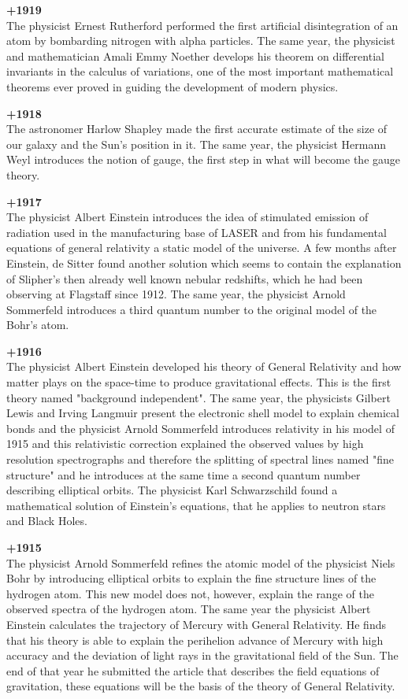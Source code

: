 \textbf{+1919}\\
The physicist Ernest Rutherford performed the first artificial disintegration of an atom by bombarding nitrogen with alpha particles. The same year, the physicist and mathematician Amali Emmy Noether develops his theorem on differential invariants in the calculus of variations, one of the most important mathematical theorems ever proved in guiding the development of modern physics.

\textbf{+1918}\\
The astronomer Harlow Shapley made the first accurate estimate of the size of our galaxy and the Sun's position in it. The same year, the physicist Hermann Weyl introduces the notion of gauge, the first step in what will become the gauge theory.

\textbf{+1917}\\
The physicist Albert Einstein introduces the idea of stimulated emission of radiation used in the manufacturing base of LASER and from his fundamental equations of general relativity a static model of the universe. A few months after Einstein, de Sitter found another solution which seems to contain the explanation of Slipher’s then already well known nebular redshifts, which he had been observing at Flagstaff since 1912. The same year, the physicist Arnold Sommerfeld introduces a third quantum number to the original model of the Bohr's atom.

\textbf{+1916}\\
The physicist Albert Einstein developed his theory of General Relativity and how matter plays on the space-time to produce gravitational effects. This is the first theory named "background independent". The same year, the physicists Gilbert Lewis and Irving Langmuir present the electronic shell model to explain chemical bonds and the physicist Arnold Sommerfeld introduces relativity in his model of 1915 and this relativistic correction explained the observed values by high resolution spectrographs and therefore the splitting of spectral lines named "fine structure" and he introduces at the same time a second quantum number describing elliptical orbits. The physicist Karl Schwarzschild found a mathematical solution of Einstein's equations, that he applies to neutron stars and Black Holes.

\textbf{+1915}\\
The physicist Arnold Sommerfeld refines the atomic model of the physicist Niels Bohr by introducing elliptical orbits to explain the fine structure lines of the hydrogen atom. This new model does not, however, explain the range of the observed spectra of the hydrogen atom. The same year the physicist Albert Einstein calculates the trajectory of Mercury with General Relativity. He finds that his theory is able to explain the perihelion advance of Mercury with high accuracy and the deviation of light rays in the gravitational field of the Sun. The end of that year he submitted the article that describes the field equations of gravitation, these equations will be the basis of the theory of General Relativity.

